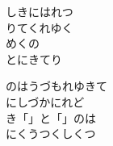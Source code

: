 \documentclass[10pt,b5j]{tarticle} %
\begin{document}
\begin{enumerate}
\begin{minipage}[c]{\blocksize}
        \vspace{\linespace}
        \item
        しきにはれつ\\
        りてくれゆく\\
        めくの\\
        とにきてり
        
        \vspace{\linespace}
        \item
        のはうづもれゆきて\\
        にしづかにれど\\
        き「」と「」のは\\
        にくうつくしくつ
    
    \end{minipage}
\end{enumerate} %
\end{document}
